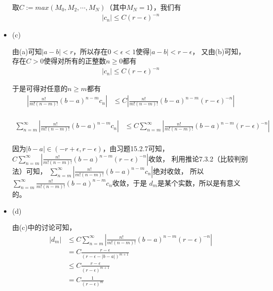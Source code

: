\documentclass{article}
\begin{document}
\begin{itemize}
        取$C := max(M_0, M_2, \cdots, M_N)$（其中$M_N = 1$），我们有
        \begin{align*}
          |c_n| \leq C(r - \epsilon)^{-n}
        \end{align*}

  \item (c)

        由(a)可知$|a - b| < r$，所以存在$0 < \epsilon < 1$使得$|a - b| < r - \epsilon$，
        又由(b)可知，存在$C > 0$使得对所有的正整数$n \geq 0$都有
        \begin{align*}
          |c_n| \leq C(r - \epsilon)^{-n}
        \end{align*}

        于是可得对任意的$n \geq m$都有
        \begin{align*}
          \left| \frac{n!}{m!(n - m)!}(b - a)^{n - m}c_n \right|
           & \leq C \left| \frac{n!}{m!(n - m)!}(b - a)^{n - m}(r - \epsilon)^{-n} \right| \\
        \end{align*}

        \begin{align*}
          \sum_{n = m}^\infty \left| \frac{n!}{m!(n - m)!}(b - a)^{n - m}c_n \right|
           & \leq C \sum_{n = m}^\infty\left| \frac{n!}{m!(n - m)!}(b - a)^{n - m}(r - \epsilon)^{-n} \right| \\
        \end{align*}

        因为$|b - a| \in (-r + \epsilon, r - \epsilon)$，由习题15.2.7可知，
        $C \sum_{n = m}^\infty\left| \frac{n!}{m!(n - m)!}(b - a)^{n - m}(r - \epsilon)^{-n} \right|$收敛，
        利用推论7.3.2（比较判别法）可知，
        $\sum_{n = m}^\infty \left| \frac{n!}{m!(n - m)!}(b - a)^{n - m}c_n \right|$绝对收敛，
        所以$\sum_{n = m}^\infty \frac{n!}{m!(n - m)!}(b - a)^{n - m}c_n$收敛，于是
        $d_m$是某个实数，所以是有意义的。

  \item (d)

        由(c)中的讨论可知，
        \begin{align*}
          |d_m| & \leq C \sum_{n = m}^\infty\left| \frac{n!}{m!(n - m)!}(b - a)^{n - m}(r - \epsilon)^{-n} \right| \\
                & = C \frac{r - \epsilon}{(r - \epsilon - |b - a|)^{m + 1}}                                        \\
                & \leq C \frac{r - \epsilon}{(r - \epsilon)^{m + 1}}                                               \\
                & = C \frac{1}{(r - \epsilon)^{m}}
        \end{align*}


\end{itemize}
\end{document}
